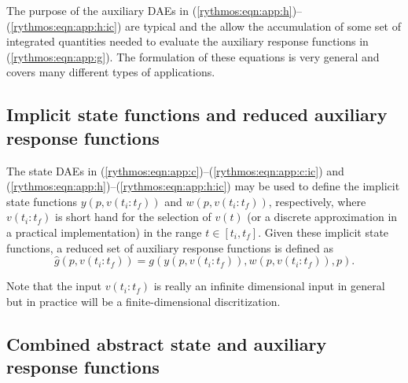 \documentclass[pdf,ps2pdf,11pt]{SANDreport}
\begin{document}
The purpose of the auxiliary DAEs in
(\ref{rythmos:eqn:app:h})--(\ref{rythmos:eqn:app:h:ic}) are typical and the
allow the accumulation of some set of integrated quantities needed to evaluate
the auxiliary response functions in (\ref{rythmos:eqn:app:g}).  The
formulation of these equations is very general and covers many different types
of applications.

\subsection{Implicit state functions and reduced auxiliary response functions}

The state DAEs in (\ref{rythmos:eqn:app:c})--(\ref{rythmos:eqn:app:c:ic}) and
(\ref{rythmos:eqn:app:h})--(\ref{rythmos:eqn:app:h:ic}) may be used to define
the implicit state functions $y(p,v(t_i:t_f))$ and $w(p,v(t_i:t_f))$,
respectively, where $v(t_i:t_f)$ is short hand for the selection of $v(t)$ (or
a discrete approximation in a practical implementation) in the range
$t\in[t_i,t_f]$.  Given these implicit state functions, a reduced set of
auxiliary response functions is defined as
%
\begin{equation}
\hat{g}(p,v(t_i:t_f)) = g(y(p,v(t_i:t_f)),w(p,v(t_i:t_f)),p).
\label{rythmos:eqn:app:g_hat}
\end{equation}

Note that the input $v(t_i:t_f)$ is really an infinite dimensional
input in general but in practice will be a finite-dimensional discritization.

\subsection{Combined abstract state and auxiliary response functions}
\end{document}
